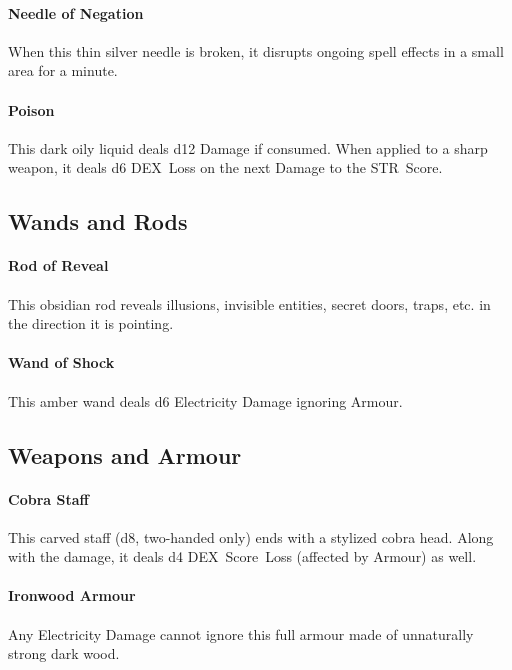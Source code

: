 \documentclass[itdr]{subfiles}
\begin{document}
\paragraph{Needle of Negation}
When this thin silver needle is broken, it disrupts ongoing spell effects in a small area for a minute.

\paragraph{Poison}
This dark oily liquid deals d12 Damage if consumed. When applied to a sharp weapon, it deals d6 DEX~Loss on the next Damage to the STR~Score.

\vfill

\subsection*{Wands and Rods}

\paragraph{Rod of Reveal}
This obsidian rod reveals illusions, invisible entities, secret doors, traps, etc. in the direction it is pointing.

\paragraph{Wand of Shock}
This amber wand deals d6 Electricity Damage \mbox{ignoring} Armour.

\vfill

\subsection*{Weapons and Armour}

\paragraph{Cobra Staff}
This carved staff (d8, two-handed only) ends with a stylized cobra head. Along with the damage, it deals d4 DEX~Score~Loss (affected by Armour) as well.

\paragraph{Ironwood Armour}
Any Electricity Damage cannot ignore this full \mbox{armour} made of unnaturally strong dark wood.
\end{document}
